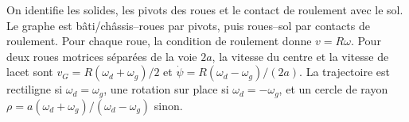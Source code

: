\begin{corrigebox}
On identifie les solides, les pivots des roues et le contact de
                roulement avec le sol. Le graphe est bâti/châssis--roues par pivots, puis
                roues--sol par contacts de roulement.
Pour chaque roue, la condition de roulement donne
                $v=R\omega$. Pour deux roues motrices séparées de la voie $2a$, la vitesse
                du centre et la vitesse de lacet sont
                $v_G=R(\omega_d+\omega_g)/2$ et
                $\dot\psi=R(\omega_d-\omega_g)/(2a)$.
La trajectoire est rectiligne si $\omega_d=\omega_g$, une rotation sur
                place si $\omega_d=-\omega_g$, et un cercle de rayon
                $\rho=a(\omega_d+\omega_g)/(\omega_d-\omega_g)$ sinon.
\end{corrigebox}
